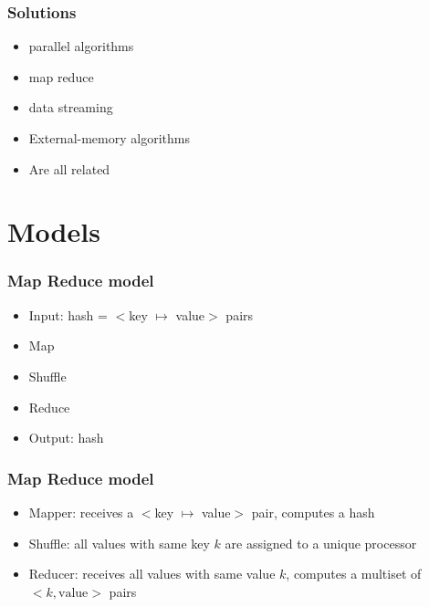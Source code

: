 \documentclass[12pt,aspectratio=169]{beamer}
\begin{document}
\begin{frame}\frametitle{Solutions}
  \begin{itemize}
  \item
    parallel algorithms
  \item
    map reduce
  \item
    data streaming
  \item
    External-memory algorithms
  \item
    Are all related
  \end{itemize}
\end{frame}


\section{Models}

\begin{frame}\frametitle{Map Reduce model}
  \begin{itemize}
  \item
    \alert{Input}: hash = $<$key $\mapsto$ value$>$ pairs
  \item
    Map
  \item
    Shuffle
  \item
    Reduce
  \item
    \alert{Output}: hash
  \end{itemize}
\end{frame}

\begin{frame}\frametitle{Map Reduce model}
  \begin{itemize}
  \item
    Mapper: receives
    \alert{a} $<$key $\mapsto$ value$>$ \alert{pair}, computes a hash
  \item
    Shuffle: \alert{all} values with \alert{same key} $k$ are assigned to a
    unique processor 
  \item
    Reducer: receives \alert{all} values with \alert{same value} $k$, computes
      a \alert{multiset} of     $<k,\text{value}>$ pairs 
  \end{itemize}
\end{frame}
\end{document}
